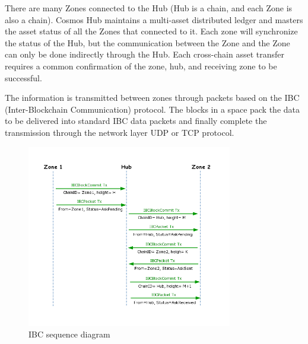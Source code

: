 \noindent There are many Zones connected to the Hub (Hub is a chain, and each Zone is also a chain). Cosmos Hub maintains a multi-asset distributed ledger and masters the asset status of all the Zones that connected to it. Each zone will synchronize the status of the Hub, but the communication between the Zone and the Zone can only be done indirectly through the Hub. Each cross-chain asset transfer requires a common confirmation of the zone, hub, and receiving zone to be successful. 
\par The information is transmitted between zones through packets based on the IBC (Inter-Blockchain Communication) protocol. The blocks in a space pack the data to be delivered into standard IBC data packets and finally complete the transmission through the network layer UDP or TCP protocol.
        \begin{figure}[H]
        \includegraphics[width=0.8\textwidth]{./figures/IBC.png}
        \centering
        \caption{IBC sequence diagram}%
        \centering
        \label{fig:IBC}
        \end{figure}
